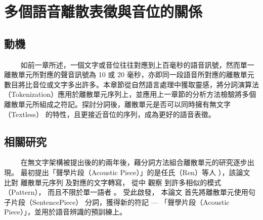 \chapter{多個語音離散表徵與音位的關係}
\newcommand{\myhline}{\noindent\makebox[\linewidth]{\rule{\paperwidth}{0.4pt}}}

\newcommand{\draftbegin}{\centerline{\textcolor{magenta}{\textbf{=======================以下是草稿！=======================}}}}
\newcommand{\drafttermi}{\centerline{\textcolor{blue}{\textbf{=======================以上是草稿！=======================}}}}



\section{動機}
　　
如前一章所述，一個文字或音位往往對應到上百毫秒的語音訊號，然而單一離散單元所對應的聲音訊號為 10 或 20 毫秒，亦即同一段語音所對應的離散單元數目將比音位或文字多出許多。本章節從自然語言處理中獲取靈感，將分詞演算法（Tokenization）應用於離散單元序列上，並應用上一章節的分析方法檢驗將多個離散單元所組成之符記。探討分詞後，離散單元是否可以同時擁有無文字（Textless）\cite{lakhotia_generative_2021, lakhotia_generative_2021-1, noauthor_textless_2021} 的特性，且更接近音位的序列，成為更好的語音表徵。
% 　　

\section{相關研究} 
　　
在無文字架構被提出後的約兩年後，藉分詞方法組合離散單元的研究逐步出現。
最初提出「聲學片段（Acoustic Piece）」的是任氏（Ren）等人 \cite{ren_speech_2022}），該論文
比對
離散單元序列
及對應的文字轉寫，
從中
觀察
到許多相似的模式（Pattern），
而且不限於單一語者
。
受此啟發，
本論文
首先將離散單元使用句子片段（SentencePiece） \cite{kudo_sentencepiece_2018} 分詞，獲得新的符記 --- 「聲學片段（Acoustic Piece）」，並用於語音辨識的預訓練上。

